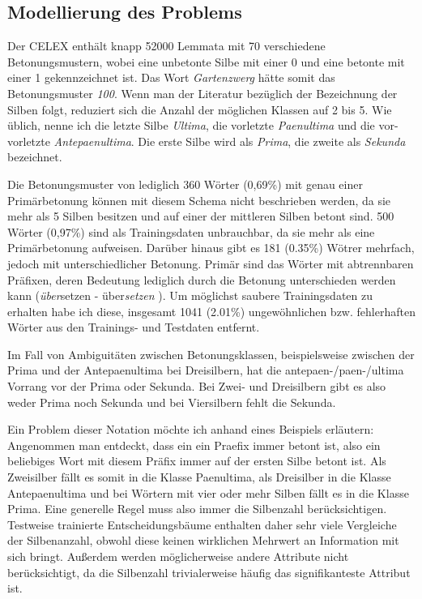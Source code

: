 \subsection{Modellierung des Problems}

Der CELEX enthält knapp 52000 Lemmata mit 70 verschiedene Betonungsmustern, wobei eine unbetonte Silbe mit einer 0 und eine betonte mit einer 1 gekennzeichnet ist. Das Wort \textit{Gartenzwerg} hätte somit das Betonungsmuster \textit{100}.
Wenn man der Literatur bezüglich der Bezeichnung der Silben folgt, reduziert sich die Anzahl der möglichen Klassen auf 2 bis 5. Wie üblich, nenne ich die letzte Silbe \textit{Ultima}, die vorletzte \textit{Paenultima} und die vor-vorletzte \textit{Antepaenultima}.  Die erste Silbe wird  als \textit{Prima}, die zweite als \textit{Sekunda} bezeichnet.

Die Betonungsmuster von lediglich 360 Wörter (0,69\%) mit genau einer Primärbetonung können mit diesem Schema nicht beschrieben werden, da sie mehr als 5 Silben besitzen und auf einer der mittleren Silben betont sind. 500 Wörter (0,97\%) sind als Trainingsdaten unbrauchbar, da sie mehr als eine Primärbetonung aufweisen. Darüber hinaus gibt es 181 (0.35\%) Wötrer mehrfach, jedoch mit unterschiedlicher Betonung. Primär sind das Wörter mit abtrennbaren Präfixen, deren Bedeutung lediglich durch die Betonung unterschieden werden kann (\textit{über}setzen - über\textit{setzen} \cite[S.~535]{}). Um möglichst saubere Trainingsdaten zu erhalten habe ich diese, insgesamt 1041 (2.01\%) ungewöhnlichen bzw. fehlerhaften Wörter aus den Trainings- und Testdaten entfernt.


Im Fall von Ambiguitäten zwischen Betonungsklassen, beispielsweise zwischen der Prima und der Antepaenultima bei Dreisilbern, hat die antepaen-/paen-/ultima Vorrang vor der Prima oder Sekunda. Bei Zwei- und Dreisilbern gibt es also weder Prima noch Sekunda und bei Viersilbern fehlt die Sekunda.

Ein Problem dieser Notation möchte ich anhand eines Beispiels erläutern: Angenommen man entdeckt, dass ein ein Praefix immer betont ist, also ein beliebiges Wort mit diesem Präfix immer auf der ersten Silbe betont ist. Als Zweisilber fällt es somit in die Klasse Paenultima, als Dreisilber in die Klasse Antepaenultima und bei Wörtern mit vier oder mehr Silben fällt es in die Klasse Prima. Eine generelle Regel muss also immer die Silbenzahl berücksichtigen.
Testweise trainierte Entscheidungsbäume enthalten daher sehr viele Vergleiche der Silbenanzahl, obwohl diese keinen wirklichen Mehrwert an Information mit sich bringt. Außerdem werden möglicherweise andere Attribute nicht berücksichtigt, da die Silbenzahl trivialerweise häufig das signifikanteste Attribut ist.

